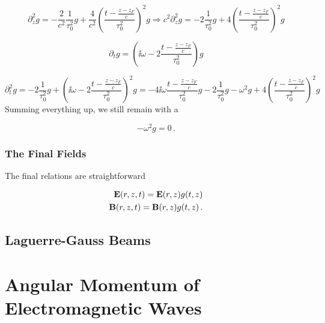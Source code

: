 \documentclass[12pt, class=report, crop=false]{standalone}
\begin{document}
\begin{equation}
  \partial_z^2 g = - \frac{2}{c^2} \frac{1}{\tau_0^2} g + \frac{4}{c^2} \left(\frac{t-\frac{z-z_F}{c}}{\tau_0^2} \right)^2 g \Rightarrow c^2\partial_z^2 g = - 2 \frac{1}{\tau_0^2} g+ 4 \left(\frac{t-\frac{z-z_F}{c}}{\tau_0^2} \right)^2 g
\end{equation}

\begin{equation}
  \partial_t g = \left(\ii \omega - 2 \frac{t-\frac{z-z_F}{c}}{\tau_0^2} \right) g
\end{equation}

\begin{equation}
  \partial_t^2 g = - 2 \frac{1}{\tau_0^2} g + \left(\ii \omega - 2 \frac{t-\frac{z-z_F}{c}}{\tau_0^2} \right)^2 g = - 4\ii \omega \frac{t-\frac{z-z_F}{c}}{\tau_0^2} g - 2 \frac{1}{\tau_0^2} g - \omega^2 g+ 4 \left(\frac{t-\frac{z-z_F}{c}}{\tau_0^2} \right)^2 g
\end{equation}
Summing everything up, we still remain with a

\begin{equation}
  - \omega^2 g = 0\,.
\end{equation}


\subsubsection{The Final Fields}

The final relations are straightforward

\begin{subequations}
  \begin{align}
    \vb{E}(r,z,t) = \vb{E}(r,z) g(t,z) \\
    \vb{B}(r,z,t) = \vb{B}(r,z) g(t,z)\,.
  \end{align}
\end{subequations}

\subsection{Laguerre-Gauss Beams}

\section{Angular Momentum of Electromagnetic Waves}
\end{document}
